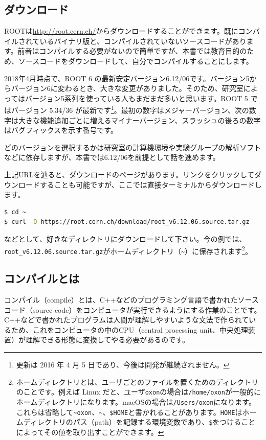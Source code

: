 \subsection{ダウンロード}
\label{subsec:download}
ROOTは\url{http://root.cern.ch/}からダウンロードすることができます。既にコンパイルされているバイナリ版と、コンパイルされていないソースコードがあります。前者はコンパイルする必要がないので簡単ですが、本書では教育目的のため、ソースコードをダウンロードして、自分でコンパイルすることにします。

2018年4月時点で、ROOT 6 の最新安定バージョン6.12/06です。バージョン5からバージョン6に変わるとき、大きな変更がありました。そのため、研究室によってはバージョン5系列を使っている人もまだまだ多いと思います。ROOT 5 ではバージョン 5.34/36 が最新です\footnote{更新は 2016 年 4 月 5 日であり、今後は開発が継続されません。}。最初の数字はメジャーバージョン、次の数字は大きな機能追加ごとに増えるマイナーバージョン、スラッシュの後ろの数字はバグフィックスを示す番号です。

どのバージョンを選択するかは研究室の計算機環境や実験グループの解析ソフトなどに依存しますが、本書では6.12/06を前提として話を進めます。

上記URLを辿ると、ダウンロードのページがあります。リンクをクリックしてダウンロードすることも可能ですが、ここでは直接ターミナルからダウンロードします。
\begin{lstlisting}[language=bash]
$ cd ~
$ curl -O https://root.cern.ch/download/root_v6.12.06.source.tar.gz
\end{lstlisting}
などとして、好きなディレクトリにダウンロードして下さい。今の例では、\texttt{root\_v6.12.06.source.tar.gz}がホームディレクトリ（\texttt{\~}）に保存されます\footnote{ホームディレクトリとは、ユーザごとのファイルを置くためのディレクトリのことです。例えば Linux だと、ユーザ\texttt{oxon}の場合は\texttt{/home/oxon}が一般的にホームディレクトリになります。macOSの場合は\texttt{/Users/oxon}になります。これらは省略して\texttt{{\textasciitilde}oxon}、\texttt{\textasciitilde}、\texttt{\$HOME}と書かれることがあります。\texttt{HOME}はホームディレクトリのパス（path）を記録する環境変数であり、\texttt{\$}をつけることによってその値を取り出すことができます。}。

\subsection{コンパイルとは}
コンパイル（compile）とは、C++などのプログラミング言語で書かれたソースコード（source code）をコンピュータが実行できるようにする作業のことです。C++などで書かれたプログラムは人間が理解しやすいような文法で作られているため、これをコンピュータの中のCPU（central processing unit、中央処理装置）が理解できる形態に変換してやる必要があるのです。

